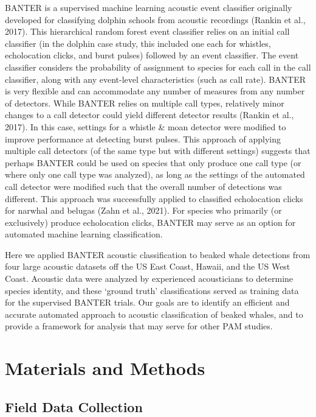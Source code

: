 \documentclass[
  authoryear,
  preprint,
  3p]{elsarticle}
\begin{document}
BANTER is a supervised machine learning acoustic event classifier
originally developed for classifying dolphin schools from acoustic
recordings (Rankin et al., 2017). This hierarchical random forest event
classifier relies on an initial call classifier (in the dolphin case
study, this included one each for whistles, echolocation clicks, and
burst pulses) followed by an event classifier. The event classifier
considers the probability of assignment to species for each call in the
call classifier, along with any event-level characteristics (such as
call rate). BANTER is very flexible and can accommodate any number of
measures from any number of detectors. While BANTER relies on multiple
call types, relatively minor changes to a call detector could yield
different detector results (Rankin et al., 2017). In this case, settings
for a whistle \& moan detector were modified to improve performance at
detecting burst pulses. This approach of applying multiple call
detectors (of the same type but with different settings) suggests that
perhaps BANTER could be used on species that only produce one call type
(or where only one call type was analyzed), as long as the settings of
the automated call detector were modified such that the overall number
of detections was different. This approach was successfully applied to
classified echolocation clicks for narwhal and belugas (Zahn et al.,
2021). For species who primarily (or exclusively) produce echolocation
clicks, BANTER may serve as an option for automated machine learning
classification.

Here we applied BANTER acoustic classification to beaked whale
detections from four large acoustic datasets off the US East Coast,
Hawaii, and the US West Coast. Acoustic data were analyzed by
experienced acousticians to determine species identity, and these
`ground truth' classifications served as training data for the
supervised BANTER trials. Our goals are to identify an efficient and
accurate automated approach to acoustic classification of beaked whales,
and to provide a framework for analysis that may serve for other PAM
studies.

\hypertarget{materials-and-methods}{%
\section{Materials and Methods}\label{materials-and-methods}}

\hypertarget{field-data-collection}{%
\subsection{Field Data Collection}\label{field-data-collection}}
\end{document}
